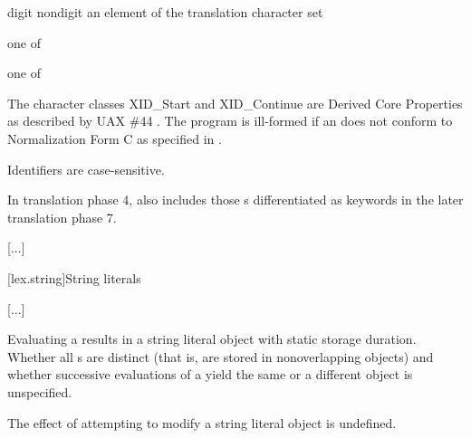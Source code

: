 \documentclass{wg21}
\begin{document}
\begin{bnf}
    \br
    digit\br
    nondigit\br
    \textnormal{an element of the translation character set }
\end{bnf}

\begin{bnf}
     \textnormal{one of}\br
    \br
    \br
    \br
\end{bnf}

\begin{bnf}
     \textnormal{one of}\br
\end{bnf}

\pnum
{}%
%
\added{[Note:}The character classes XID_Start and XID_Continue
are Derived Core Properties as described by UAX \#44 .\added{--end note]}
The program is ill-formed
if an  does not conform to
Normalization Form C as specified in .
\begin{note}
    Identifiers are case-sensitive.
\end{note}
\begin{note}
    In translation phase 4,
     also includes
    those s
    differentiated as keywords
    in the later translation phase 7.
\end{note}

\textcolor{noteclr}{[...]}

[lex.string]{String literals}

\textcolor{noteclr}{[...]}


\pnum
Evaluating a  results in a string literal object
with static storage duration.
%
Whether all s are distinct (that is, are stored in
nonoverlapping objects) and whether successive evaluations of a
 yield the same or a different object is
unspecified.
\begin{note}
    The effect of attempting to modify a string literal object is undefined.
\end{note}
\end{document}
